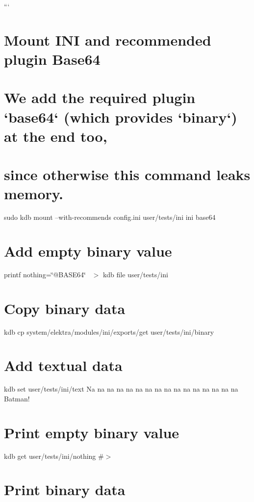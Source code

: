 ``` \hypertarget{autotoc_md289_autotoc_md295}{}\section{Mount I\+N\+I and recommended plugin Base64}\label{autotoc_md289_autotoc_md295}
\hypertarget{autotoc_md289_autotoc_md296}{}\section{We add the required plugin `base64` (which provides `binary`) at the end too,}\label{autotoc_md289_autotoc_md296}
\hypertarget{autotoc_md289_autotoc_md297}{}\section{since otherwise this command leaks memory.}\label{autotoc_md289_autotoc_md297}
sudo kdb mount --with-\/recommends config.\+ini user/tests/ini ini base64\hypertarget{autotoc_md289_autotoc_md298}{}\section{Add empty binary value}\label{autotoc_md289_autotoc_md298}
printf \textquotesingle{}nothing=\char`\"{}@\+B\+A\+S\+E64\char`\"{}~\newline
\textquotesingle{} $>$ {\ttfamily kdb file user/tests/ini} \hypertarget{autotoc_md289_autotoc_md299}{}\section{Copy binary data}\label{autotoc_md289_autotoc_md299}
kdb cp system/elektra/modules/ini/exports/get user/tests/ini/binary \hypertarget{autotoc_md289_autotoc_md300}{}\section{Add textual data}\label{autotoc_md289_autotoc_md300}
kdb set user/tests/ini/text \textquotesingle{}Na na na na na na na na na na na na na na na na Batman!\textquotesingle{}\hypertarget{autotoc_md289_autotoc_md301}{}\section{Print empty binary value}\label{autotoc_md289_autotoc_md301}
kdb get user/tests/ini/nothing \#$>$\hypertarget{autotoc_md289_autotoc_md302}{}\section{Print binary data}\label{autotoc_md289_autotoc_md302}
